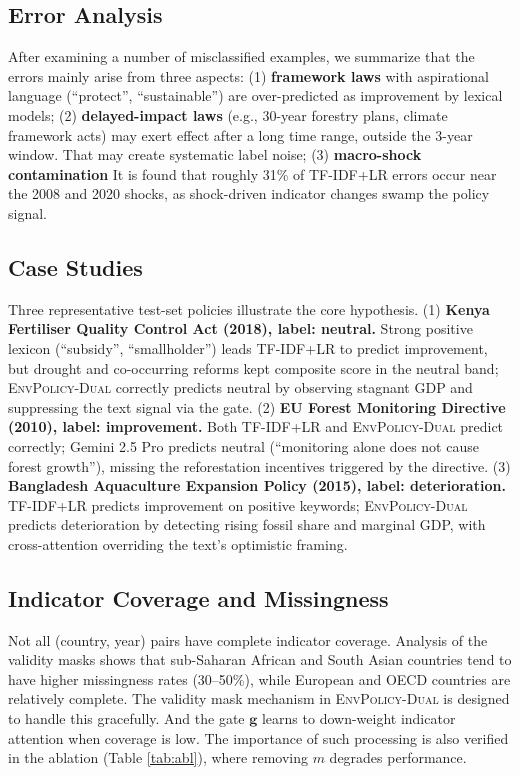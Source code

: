 \documentclass[11pt]{article}
\newcommand{\ours}{\textsc{EnvPolicy-Dual}}
\begin{document}
\subsection{Error Analysis}
\label{sec:err}

After examining a number of misclassified examples, we summarize that the errors mainly arise from three aspects:
(1) \textbf{framework laws} with aspirational language (``protect'', ``sustainable'') are over-predicted as \textsf{improvement} by lexical models;
(2) \textbf{delayed-impact laws} (e.g., 30-year forestry plans, climate framework acts) may exert effect after a long time range, outside the 3-year window. That may create systematic label noise;
(3) \textbf{macro-shock contamination} It is found that roughly 31\% of TF-IDF+LR errors occur near the 2008 and 2020 shocks, as shock-driven indicator changes swamp the policy signal.

\subsection{Case Studies }
\label{sec:case}
Three representative test-set policies illustrate the core hypothesis.
(1) \textbf{Kenya Fertiliser Quality Control Act (2018), label: neutral.}
Strong positive lexicon (``subsidy'', ``smallholder'') leads TF-IDF+LR to predict \textsf{improvement}, but drought and co-occurring reforms kept composite score in the neutral band; \ours{} correctly predicts \textsf{neutral} by observing stagnant GDP and suppressing the text signal via the gate.
(2) \textbf{EU Forest Monitoring Directive (2010), label: improvement.}
Both TF-IDF+LR and \ours{} predict correctly; Gemini 2.5 Pro predicts \textsf{neutral} (``monitoring alone does not cause forest growth''), missing the reforestation incentives triggered by the directive.
(3) \textbf{Bangladesh Aquaculture Expansion Policy (2015), label: deterioration.}
TF-IDF+LR predicts \textsf{improvement} on positive keywords; \ours{} predicts \textsf{deterioration} by detecting rising fossil share and marginal GDP, with cross-attention overriding the text's optimistic framing.

\subsection{Indicator Coverage and Missingness}

Not all (country, year) pairs have complete indicator coverage. Analysis of the validity masks shows that sub-Saharan African and South Asian countries tend to have higher missingness rates (30--50\%), while European and OECD countries are relatively complete. The validity mask mechanism in \ours{} is designed to handle this gracefully.  And the gate $\mathbf{g}$ learns to down-weight indicator attention when coverage is low. The importance of such processing is also verified in the ablation (Table \ref{tab:abl}), where removing $m$ degrades performance.
\end{document}
